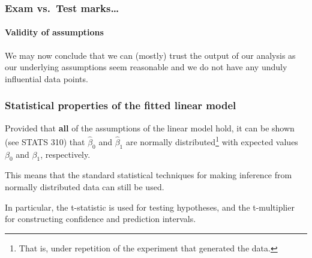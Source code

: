 \documentclass{beamer}\usepackage[]{graphicx}\usepackage[]{xcolor}
\begin{document}
\begin{frame}[fragile]
\frametitle{Exam vs.\ Test marks\ldots}
\framesubtitle{Validity of assumptions}

We may now conclude that we can (mostly) trust the output of our analysis as our underlying assumptions seem reasonable and we do not have any unduly influential data points.

\end{frame}






\begin{frame}
\frametitle{Statistical properties of the fitted linear model}
Provided that {\bf all} of the assumptions of the linear model hold, it can be shown (see STATS 310) that $\hat{\beta}_0$ and $\hat{\beta}_1$ are normally distributed\footnote{That is, under repetition of the experiment that generated the data.} with expected values $\beta_0$ and $\beta_1$, respectively.
\bigskip

This means that the standard statistical techniques for making inference from normally distributed data can still be used.
\medskip

In particular, the t-statistic is used for testing hypotheses, and the t-multiplier for constructing confidence and prediction intervals.
\end{frame}
  
\end{document}
